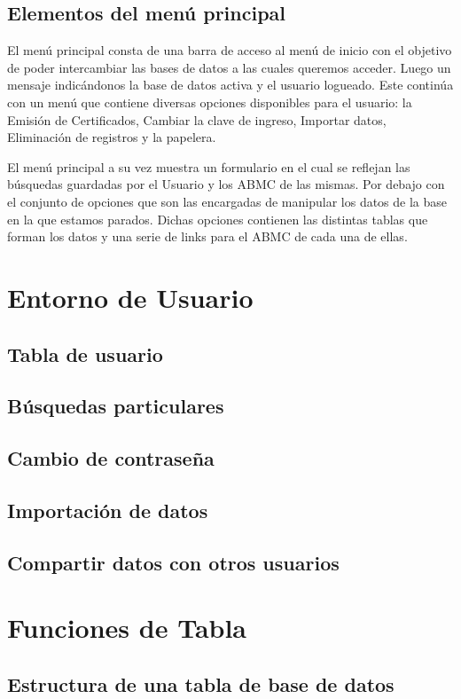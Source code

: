 \documentclass[a4paper,10pt]{article}
\begin{document}
\subsection{Elementos del menú principal}
El menú principal consta de una barra de acceso al menú de inicio con el objetivo de poder intercambiar las bases de datos a las cuales queremos acceder.
Luego un mensaje indicándonos la base de datos activa y el usuario logueado.
Este continúa con un menú que contiene diversas opciones disponibles para el usuario: la Emisión de Certificados, Cambiar la clave de ingreso, Importar datos, Eliminación de registros y la papelera.

El menú principal a su vez muestra un formulario en el cual se reflejan las búsquedas guardadas por el Usuario y los ABMC de las mismas.
Por debajo con el conjunto de opciones que son las encargadas de manipular los datos de la base en la que estamos parados.
Dichas opciones contienen las distintas tablas que forman los datos y una serie de links para el ABMC de cada una de ellas.



\section{Entorno de Usuario}
\subsection{Tabla de usuario}
\subsection{Búsquedas particulares}
\subsection{Cambio de contraseña}
\subsection{Importación de datos}
\subsection{Compartir datos con otros usuarios}


\section{Funciones de Tabla}

\subsection{Estructura de una tabla de base de datos}
\end{document}
